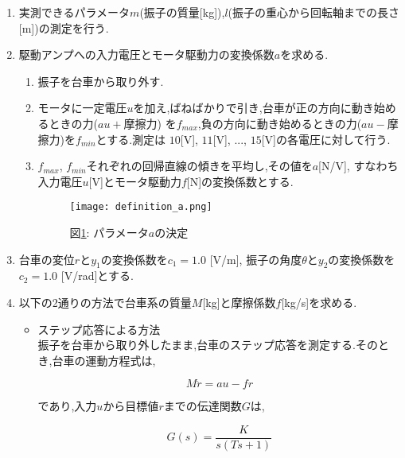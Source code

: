 \begin{enumerate}
    \item 実測できるパラメータ$m$(振子の質量[kg]),$l$(振子の重心から回転軸までの長さ[m])の測定を行う.
    \item 駆動アンプへの入力電圧とモータ駆動力の変換係数$a$を求める.
    \begin{enumerate}
        \item 振子を台車から取り外す.
        \item モータに一定電圧$u$を加え,ばねばかりで引き,台車が正の方向に動き始めるときの力($au+$摩擦力)
        を$f_{max}$,負の方向に動き始めるときの力($au-$摩擦力)を$f_{min}$とする.測定は
        $10$[V], $11$[V], ..., $15$[V]の各電圧に対して行う.
        \item $f_{max}$, $f_{min}$それぞれの回帰直線の傾きを平均し,その値を$a$[N/V],
        すなわち入力電圧$u$[V]とモータ駆動力$f$[N]の変換係数とする.
        \begin{figure}[htbp]
            \begin{center}
                \texttt{[image: definition\_a.png]}
                \caption{図\ref{definition_a}: パラメータ$a$の決定}
                \label{definition_a}
            \end{center}
        \end{figure}
    \end{enumerate}

    \item 台車の変位$r$と$y_{1}$の変換係数を$c_{1} = 1.0$ [V/m], 
    振子の角度$\theta$と$y_{2}$の変換係数を$c_{2} = 1.0$ [V/rad]とする.

    \item 以下の2通りの方法で台車系の質量$M$[kg]と摩擦係数$f$[kg/s]を求める.
    \begin{itemize}
        \item ステップ応答による方法　\\
        \quad 振子を台車から取り外したまま,台車のステップ応答を測定する.そのとき,台車の運動方程式は,

        \begin{equation}
            M \ddot r = au - fr
            \label{eq_model}
        \end{equation}

        であり,入力$u$から目標値$r$までの伝達関数$G$は,

        \begin{equation}
            G(s) = \frac{K}{s(Ts + 1)}
        \end{equation}


\end{itemize}
\end{enumerate}
